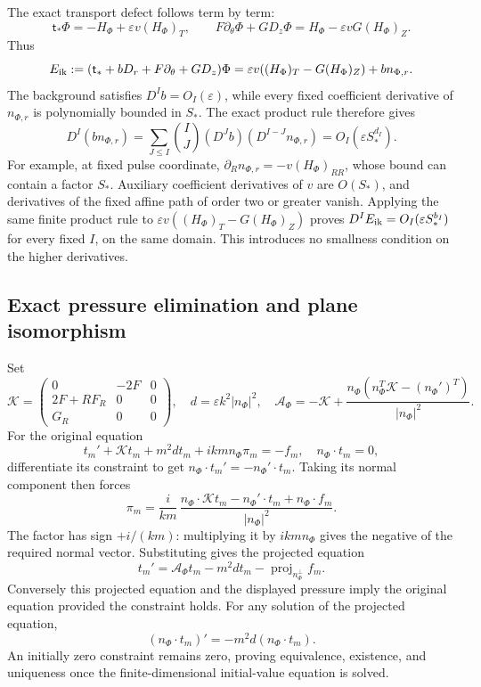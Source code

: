 \documentclass[10pt,a4paper]{article}
\begin{document}
The exact transport defect follows term by term: \[
\mathsf t_*\Phi=-H_\Phi+\varepsilon v(H_\Phi)_T,\qquad
F\partial_\theta\Phi+GD_z\Phi=H_\Phi-\varepsilon vG(H_\Phi)_Z.
\] Thus \[
E_{\rm ik}:=(\mathsf t_*+bD_r+F\partial_\theta+GD_z)\Phi
=\varepsilon v((H_\Phi)_T-G(H_\Phi)_Z)+bn_{\Phi,r}.
\] The background satisfies \(D^Ib=O_I(\varepsilon)\), while every
fixed coefficient derivative of \(n_{\Phi,r}\) is polynomially
bounded in \(S_*\). The exact product rule therefore gives
\[
D^I(bn_{\Phi,r})
=\sum_{J\le I}\binom IJ(D^Jb)(D^{I-J}n_{\Phi,r})
=O_I(\varepsilon S_*^{d_I}).
\]
For example, at fixed pulse coordinate,
\(\partial_Rn_{\Phi,r}=-v(H_\Phi)_{RR}\), whose bound can contain
a factor \(S_*\). Auxiliary coefficient derivatives of \(v\)
are \(O(S_*)\), and derivatives of the fixed affine path of order
two or greater vanish. Applying the same finite product rule
to \(\varepsilon v((H_\Phi)_T-G(H_\Phi)_Z)\) proves
\(D^IE_{\rm ik}=O_I(\varepsilon S_*^{b_I})\) for every fixed
\(I\), on the same domain. This introduces no smallness condition
on the higher derivatives.

\subsection{Exact pressure elimination and plane isomorphism}\label{si:exact-pressure-elimination-and-plane-isomorphism}

Set \[
\mathcal K=
\begin{pmatrix}0&-2F&0\\2F+RF_R&0&0\\G_R&0&0\end{pmatrix},
\quad d=\varepsilon k^2|n_\Phi|^2,\quad
\mathcal A_\Phi=-\mathcal K+
\frac{n_\Phi(n_\Phi^T\mathcal K-(n_\Phi')^T)}{|n_\Phi|^2}.
\] For the original equation \[
t_m'+\mathcal Kt_m+m^2dt_m+ikm n_\Phi\pi_m=-f_m,
\quad n_\Phi\cdot t_m=0,
\] differentiate its constraint to get \(n_\Phi\cdot t_m'=-n_\Phi'\cdot t_m\). Taking its normal component then forces \[
\pi_m=\frac{i}{km}\,
\frac{n_\Phi\cdot\mathcal Kt_m-n_\Phi'\cdot t_m+n_\Phi\cdot f_m}{|n_\Phi|^2}.
\] The factor has sign \(+i/(km)\): multiplying it by \(ikm n_\Phi\) gives the negative of the required normal vector. Substituting gives the projected equation \[
t_m'=\mathcal A_\Phi t_m-m^2dt_m-\operatorname{proj}_{n_\Phi^\perp}f_m.
\] Conversely this projected equation and the displayed pressure imply the original equation provided the constraint holds. For any solution of the projected equation, \[
(n_\Phi\cdot t_m)'=-m^2d(n_\Phi\cdot t_m).
\] An initially zero constraint remains zero, proving equivalence, existence, and uniqueness once the finite-dimensional initial-value equation is solved.
\end{document}
